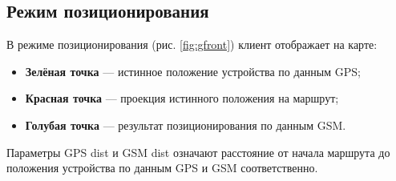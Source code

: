 \subsection{Режим позиционирования}
В режиме позиционирования (рис. \ref{fig:gfront}) клиент отображает на карте:
\begin{itemize}
	\item
		{\bf{}Зелёная точка} --- истинное положение устройства по данным GPS;
	\item
		{\bf{}Красная точка} --- проекция истинного положения на маршрут;
	\item
		{\bf{}Голубая точка} --- результат позиционирования по данным GSM.
\end{itemize}

Параметры GPS dist и GSM dist означают расстояние от начала маршрута до положения устройства по данным GPS и GSM соответственно.
